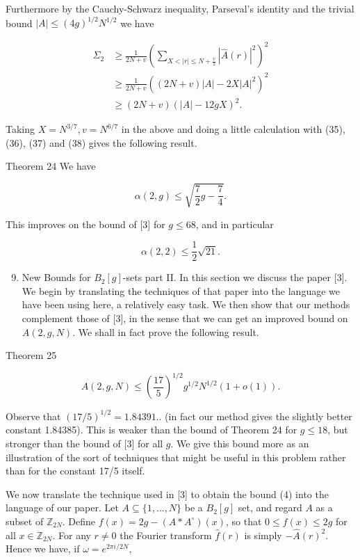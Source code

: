 \documentclass[10pt]{article}
\begin{document}
Furthermore by the Cauchy-Schwarz inequality, Parseval's identity and the trivial bound $|A| \leq(4 g)^{1 / 2} N^{1 / 2}$ we have


\begin{align*}
\Sigma_{2} & \geq \frac{1}{2 N+v}\left(\sum_{X<|r| \leq N+\frac{v}{2}}|\hat{A}(r)|^{2}\right)^{2} \\
& \geq \frac{1}{2 N+v}\left((2 N+v)|A|-2 X|A|^{2}\right)^{2} \\
& \geq(2 N+v)(|A|-12 g X)^{2} . \tag{38}
\end{align*}


Taking $X=N^{3 / 7}, v=N^{6 / 7}$ in the above and doing a little calculation with (35), (36), (37) and (38) gives the following result.

Theorem 24 We have

$$
\alpha(2, g) \leq \sqrt{\frac{7}{2} g-\frac{7}{4}} .
$$

This improves on the bound of [3] for $g \leq 68$, and in particular

$$
\alpha(2,2) \leq \frac{1}{2} \sqrt{21} .
$$

\begin{enumerate}
  \setcounter{enumi}{8}
  \item New Bounds for $B_{2}[g]$-sets part II. In this section we discuss the paper [3]. We begin by translating the techniques of that paper into the language we have been using here, a relatively easy task. We then show that our methods complement those of [3], in the sense that we can get an improved bound on $A(2, g, N)$. We shall in fact prove the following result.
\end{enumerate}

Theorem 25

$$
A(2, g, N) \leq\left(\frac{17}{5}\right)^{1 / 2} g^{1 / 2} N^{1 / 2}(1+o(1)) .
$$

Observe that $(17 / 5)^{1 / 2}=1.84391$.. (in fact our method gives the slightly better constant 1.84385). This is weaker than the bound of Theorem 24 for $g \leq 18$, but stronger than the bound of [3] for all $g$. We give this bound more as an illustration of the sort of techniques that might be useful in this problem rather than for the constant 17/5 itself.

We now translate the technique used in [3] to obtain the bound (4) into the language of our paper. Let $A \subseteq\{1, \ldots, N\}$ be a $B_{2}[g]$ set, and regard $A$ as a subset of $\mathbb{Z}_{2 N}$. Define $f(x)=2 g-\left(A * A^{\circ}\right)(x)$, so that $0 \leq f(x) \leq 2 g$ for all $x \in \mathbb{Z}_{2 N}$. For any $r \neq 0$ the Fourier transform $\hat{f}(r)$ is simply $-\hat{A}(r)^{2}$. Hence we have, if $\omega=e^{2 \pi i / 2 N}$,
\end{document}
